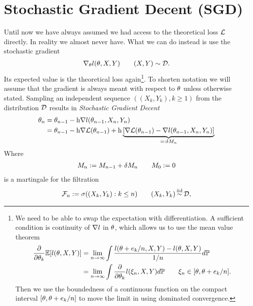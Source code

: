 
\chapter{Stochastic Gradient Decent (SGD)}

Until now we have always assumed we had access to the theoretical loss \(\mathcal{L}\) 
directly. In reality we almost never have. What we can do instead is use the
stochastic gradient
%
\begin{align*}
	\nabla_\theta l (\theta, X,Y) \qquad (X,Y)\sim\mathcal{D}.
\end{align*}
%
Its expected value is the theoretical loss again\footnote{
	We need to be able to swap the expectation with differentiation. A sufficient 
	condition is continuity of \(\nabla l\) in \(\theta\), which allows us
	to use the mean value theorem
	\begin{align*}
		\frac{\partial}{\partial \theta_k}\mathbb{E}[l(\theta, X,Y)]
		&= \lim_{n\to\infty}
		\int\frac{l(\theta+e_k/n, X,Y)-l(\theta,X,Y)}{1/n}d\mathbb{P}
		\\
		&=\lim_{n\to\infty} \int\frac{\partial}{\partial \theta_k}l(\xi_n, X,Y)d\mathbb{P}
		\qquad \xi_n \in [\theta, \theta + e_k/n].
	\end{align*}
	Then we use the boundedness of a continuous function on the compact interval
	\([\theta, \theta + e_k/n]\) to move the limit in using
	dominated convergence.
}. To shorten notation we will assume that the gradient is always meant
with respect to \(\theta\) unless otherwise stated.
Sampling an independent sequence \(((X_k,Y_k), k\ge 1)\) from the 
distribution \(\mathcal{D}\) results in \emph{Stochastic Gradient Decent}
%
\begin{align*}
	\theta_n
	&= \theta_{n-1} - \text{h}\nabla l(\theta_{n-1}, X_n,Y_n)\\
	&= \theta_{n-1} - \text{h}\nabla\mathcal{L}(\theta_{n-1})
	+ \text{h}\underbrace{
		[\nabla\mathcal{L}(\theta_{n-1}) - \nabla l(\theta_{n-1}, X_n, Y_n)]
	}_{=:\delta M_n}
\end{align*}
Where
\begin{align*}
	M_n := M_{n-1} + \delta M_n \qquad M_0:=0
\end{align*}
is a martingale for the filtration
\begin{align*}
	\filtration_n :=\sigma((X_k, Y_k): k\le n )
	\qquad (X_k,Y_k)\stackrel{\text{iid}}{\sim}\dist,
\end{align*}
